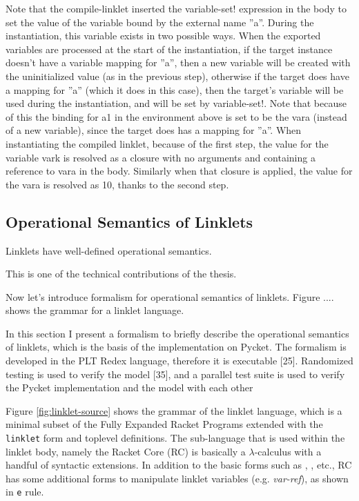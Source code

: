 		\begin{paragraph-here}
			Note that the compile-linklet inserted the variable-set! expression in the body to set the value of the variable bound by the external name ”a”. During the instantiation, this variable exists in two possible ways. When the exported variables are processed at the start of the instantiation, if the target instance doesn’t have a variable mapping for ”a”, then a new variable will be created with the uninitialized value (as in the previous step), otherwise if the target does have a mapping for ”a” (which it does in this case), then the target’s variable will be used during the instantiation, and will be set by variable-set!. Note that because of this the binding for a1 in the environment above is set to be the vara (instead of a new variable), since the target does has a mapping for ”a”.
			When instantiating the compiled linklet, because of the first step, the value for the variable vark is resolved as a closure with no arguments and containing a reference to vara in the body. Similarly when that closure is applied, the value for the vara is resolved as 10, thanks to the second step.
		\end{paragraph-here}


		\subsection{Operational Semantics of Linklets}

			\begin{mainpoint}
				Linklets have well-defined operational semantics.

				This is one of the technical contributions of the thesis.
			\end{mainpoint}

			\begin{paragraph-here}
				Now let's introduce formalism for operational semantics of linklets. Figure .... shows the grammar for a linklet language.

				In this section I present a formalism to briefly describe the operational semantics of linklets, which is the basis of the implementation on Pycket. The formalism is developed in the PLT Redex language, therefore it is executable [25]. Randomized testing is used to verify the model [35], and a parallel test suite is used to verify the Pycket implementation and the model with each other
			\end{paragraph-here}


			\begin{paragraph-here}
				Figure \ref{fig:linklet-source} shows the grammar of the linklet
				language, which is a minimal subset of the Fully Expanded Racket
				Programs extended with the \verb|linklet| form and toplevel
				definitions. The sub-language that is used within the linklet body,
				namely the Racket Core (RC) is basically a $\lambda$-calculus with a handful
				of syntactic extensions. In addition to the basic forms such
				as , ,  etc., RC has
				some additional forms to manipulate linklet variables
				(e.g. \emph{var-ref}), as shown in \verb|e| rule. %
			\end{paragraph-here}

